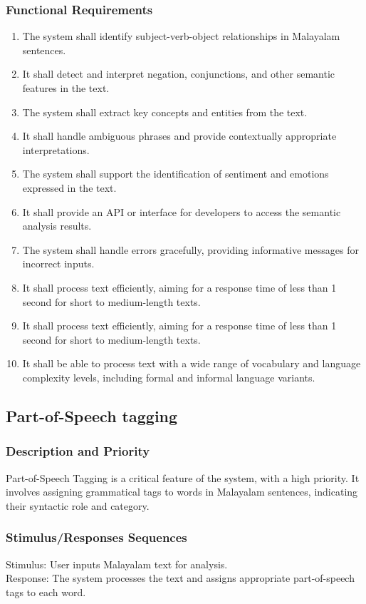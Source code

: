 \documentclass[12pt]{article}
\begin{document}
	\subsubsection{Functional Requirements}
	\begin{enumerate}
		\item The system shall identify subject-verb-object relationships in Malayalam
		sentences.
		\item It shall detect and interpret negation, conjunctions, and other semantic features in
		the text.
		\item The system shall extract key concepts and entities from the text.
		\item It shall handle ambiguous phrases and provide contextually appropriate
		interpretations.
		\item The system shall support the identification of sentiment and emotions expressed in
		the text.
		\item It shall provide an API or interface for developers to access the semantic analysis
		results.
		\item The system shall handle errors gracefully, providing informative messages for
		incorrect inputs.
		\item It shall process text efficiently, aiming for a response time of less than 1 second for
		short to medium-length texts.
		\item It shall process text efficiently, aiming for a response time of less than 1 second for
		short to medium-length texts.
		\item It shall be able to process text with a wide range of vocabulary and language
		complexity levels, including formal and informal language variants.
	\end{enumerate}
	
	\subsection{Part-of-Speech tagging}
	
	\subsubsection{Description and Priority}
	Part-of-Speech Tagging is a critical feature of the system, with a high priority. It involves
	assigning grammatical tags to words in Malayalam sentences, indicating their syntactic
	role and category.
	
	\subsubsection{Stimulus/Responses Sequences}
	Stimulus: User inputs Malayalam text for analysis.\\
	Response: The system processes the text and assigns appropriate part-of-speech tags to
	each word.
	
\end{document}
